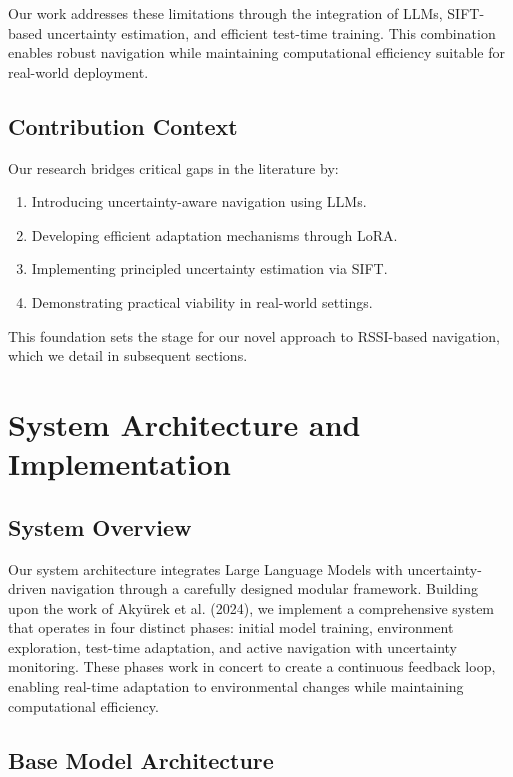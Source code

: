 \documentclass[12pt]{article}
\begin{document}
Our work addresses these limitations through the integration of LLMs, SIFT-based uncertainty estimation, and efficient test-time training. This combination enables robust navigation while maintaining computational efficiency suitable for real-world deployment.

\subsection{Contribution Context}

Our research bridges critical gaps in the literature by:
\begin{enumerate}
    \item Introducing uncertainty-aware navigation using LLMs.
    \item Developing efficient adaptation mechanisms through LoRA.
    \item Implementing principled uncertainty estimation via SIFT.
    \item Demonstrating practical viability in real-world settings.
\end{enumerate}

This foundation sets the stage for our novel approach to RSSI-based navigation, which we detail in subsequent sections.
\section{System Architecture and Implementation}

\subsection{System Overview}

Our system architecture integrates Large Language Models with uncertainty-driven navigation through a carefully designed modular framework. Building upon the work of Akyürek et al. (2024), we implement a comprehensive system that operates in four distinct phases: initial model training, environment exploration, test-time adaptation, and active navigation with uncertainty monitoring. These phases work in concert to create a continuous feedback loop, enabling real-time adaptation to environmental changes while maintaining computational efficiency.

\subsection{Base Model Architecture}
\end{document}
